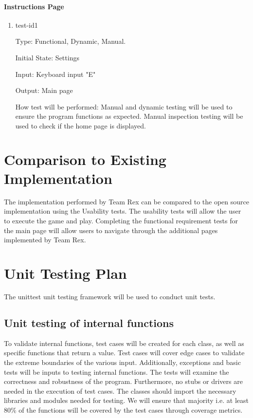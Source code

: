 \documentclass[12pt, titlepage]{article}
\begin{document}
	
	\paragraph{Instructions Page}
	
	\begin{enumerate}
		
		\item{test-id1\\}
		
		Type: Functional, Dynamic, Manual.
		
		Initial State: Settings 
		
		Input: Keyboard input "E"
		
		Output: Main page
		
		How test will be performed: Manual and dynamic testing will be used to ensure the program functions as expected. Manual inspection testing will be used to check if the home page is displayed. 
		
	\end{enumerate}
	
	\section{Comparison to Existing Implementation}	
	The implementation performed by Team Rex can be compared to the open source implementation using the Usability tests. The usability tests will allow the user to execute the game and play. Completing the functional requirement tests for the main page will allow users to navigate through the additional pages implemented by Team Rex. 
	
	
	\section{Unit Testing Plan}
	
	
	The unittest unit testing framework will be used to conduct unit tests.
	
	\subsection{Unit testing of internal functions}
	
	
	To validate internal functions, test cases will be created for each class, as well as specific functions that return a value. Test cases will cover edge cases to validate the extreme boundaries of the various input. Additionally, exceptions and basic tests will be inputs to testing internal functions. The tests will examine the correctness and robustness of the program.  Furthermore, no stubs or drivers are needed in the execution of test cases. The classes should import the necessary libraries and modules needed for testing. We will ensure that majority {i.e. at least 80\%} of the functions will be covered by the test cases through coverage metrics. 
	
\end{document}
